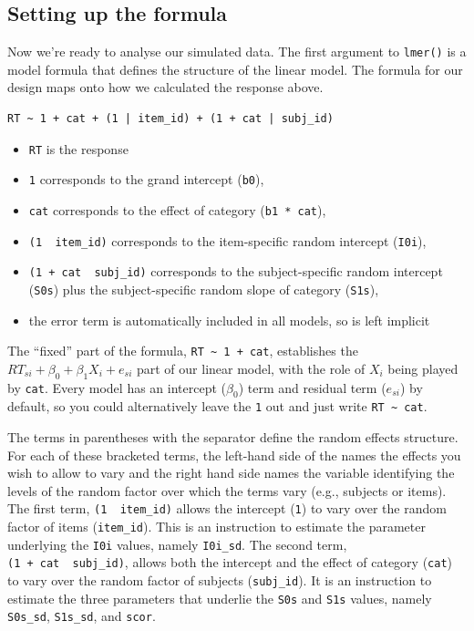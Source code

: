 \documentclass[doc,floatsintext]{apa6}
\providecommand{\tightlist}{%
  \setlength{\itemsep}{0pt}\setlength{\parskip}{0pt}}
\begin{document}
\subsection{Setting up the formula}\label{setting-up-the-formula}

Now we're ready to analyse our simulated data. The first argument to
\texttt{lmer()} is a model formula that defines the structure of the
linear model. The formula for our design maps onto how we calculated the
response above.

\begin{verbatim}
RT ~ 1 + cat + (1 | item_id) + (1 + cat | subj_id)
\end{verbatim}

\begin{itemize}
\tightlist
\item
  \texttt{RT} is the response
\item
  \texttt{1} corresponds to the grand intercept (\texttt{b0}),
\item
  \texttt{cat} corresponds to the effect of category
  (\texttt{b1\ *\ cat}),
\item
  \texttt{(1\ \textbar{}\ item\_id)} corresponds to the item-specific
  random intercept (\texttt{I0i}),
\item
  \texttt{(1\ +\ cat\ \textbar{}\ subj\_id)} corresponds to the
  subject-specific random intercept (\texttt{S0s}) plus the
  subject-specific random slope of category (\texttt{S1s}),
\item
  the error term is automatically included in all models, so is left
  implicit
\end{itemize}

The \enquote{fixed} part of the formula,
\texttt{RT\ \textasciitilde{}\ 1\ +\ cat}, establishes the
\(RT_{si} + \beta_0 + \beta_1 X_i + e_{si}\) part of our linear model,
with the role of \(X_i\) being played by \texttt{cat}. Every model has
an intercept (\(\beta_0\)) term and residual term (\(e_{si}\)) by
default, so you could alternatively leave the \texttt{1} out and just
write \texttt{RT\ \textasciitilde{}\ cat}.

The terms in parentheses with the \texttt{\textbar{}} separator define
the random effects structure. For each of these bracketed terms, the
left-hand side of the \texttt{\textbar{}} names the effects you wish to
allow to vary and the right hand side names the variable identifying the
levels of the random factor over which the terms vary (e.g., subjects or
items). The first term, \texttt{(1\ \textbar{}\ item\_id)} allows the
intercept (\texttt{1}) to vary over the random factor of items
(\texttt{item\_id}). This is an instruction to estimate the parameter
underlying the \texttt{I0i} values, namely \texttt{I0i\_sd}. The second
term, \texttt{(1\ +\ cat\ \textbar{}\ subj\_id)}, allows both the
intercept and the effect of category (\texttt{cat}) to vary over the
random factor of subjects (\texttt{subj\_id}). It is an instruction to
estimate the three parameters that underlie the \texttt{S0s} and
\texttt{S1s} values, namely \texttt{S0s\_sd}, \texttt{S1s\_sd}, and
\texttt{scor}.
\end{document}
